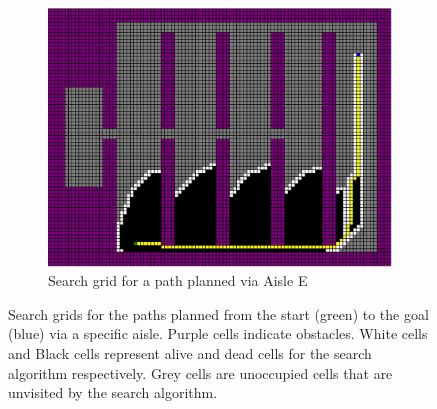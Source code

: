 \documentclass[a4paper,12pt]{article}
\begin{document}
\begin{figure}[htp]
\begin{subfigure}{.45\textwidth}
				\includegraphics[width=\textwidth]{../exports/initial_search_grid_aisleE}
				\caption{Search grid for a path planned via Aisle E}
				\label{fig:searchGridAisleE}
			\end{subfigure}
			\caption{Search grids for the paths planned from the start (green) to the goal (blue) via a specific aisle. Purple cells indicate obstacles. White cells and Black cells represent alive and dead cells for the search algorithm respectively. Grey cells are unoccupied cells that are unvisited by the search algorithm.}
			\label{fig:searchGridViaAisles}
		\end{figure}
		
\end{document}
